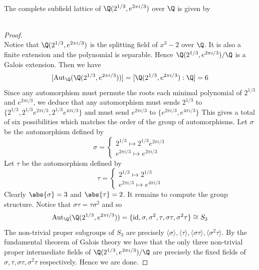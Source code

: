 \documentclass[a4paper]{article}
\begin{document}
\begin{eg}{}{}\\
The complete subfield lattice of $\Q(2^{1/3},e^{2\pi i/3})$ over $\Q$ is given by \\
\\
\begin{proof}\\
Notice that $\Q(2^{1/3},e^{2\pi i/3})$ is the splitting field of $x^3-2$ over $\Q$. It is also a finite extension and the polynomial is separable. Hence $\Q(2^{1/3},e^{2\pi i/3})/\Q$ is a Galois extension. Then we have $$[\text{Aut}_\Q(\Q(2^{1/3},e^{2\pi i/3}))]=[\Q(2^{1/3},e^{2\pi i/3}):\Q]=6$$ Since any automorphism must permute the roots each minimal polynomial of $2^{1/3}$ and $e^{2\pi i/3}$, we deduce that any automorphism must sends $2^{1/3}$ to $\{2^{1/3},2^{1/3}e^{2\pi i /3},2^{1/3}e^{4\pi i/3}\}$ and must send $e^{2\pi i/3}$ to $\{e^{2\pi i/3},e^{4\pi i/3}\}$ This gives a total of six possibilities which matches the order of the group of automorphisms. Let $\sigma$ be the automorphism defined by $$\sigma=\begin{cases}
2^{1/3}\mapsto 2^{1/3}e^{2\pi i/3}\\
e^{2\pi i/3}\mapsto e^{2\pi i/3}
\end{cases}$$ Let $\tau$ be the automorphism defined by $$\tau=\begin{cases}
2^{1/3}\mapsto 2^{1/3}\\
e^{2\pi i/3}\mapsto e^{4\pi i/3}
\end{cases}$$ 
Clearly $\abs{\sigma}=3$ and $\abs{\tau}=2$. It remains to compute the group structure. Notice that $\sigma\tau=\tau\sigma^2$ and so $$\text{Aut}_\Q(\Q(2^{1/3},e^{2\pi i/3}))=\{\text{id},\sigma,\sigma^2,\tau,\sigma\tau,\sigma^2\tau\}\cong S_3$$ The non-trivial proper subgroups of $S_3$ are precisely $\langle\sigma\rangle,\langle\tau\rangle,\langle\sigma\tau\rangle,\langle\sigma^2\tau\rangle$. By the fundamental theorem of Galois theory we have that the only three non-trivial proper intermediate fields of $\Q(2^{1/3},e^{2\pi i/3})/\Q$ are precisely the fixed fields of $\sigma,\tau,\sigma\tau,\sigma^2\tau$ respectively. Hence we are done. 
\end{proof}
\end{eg}
\end{document}
